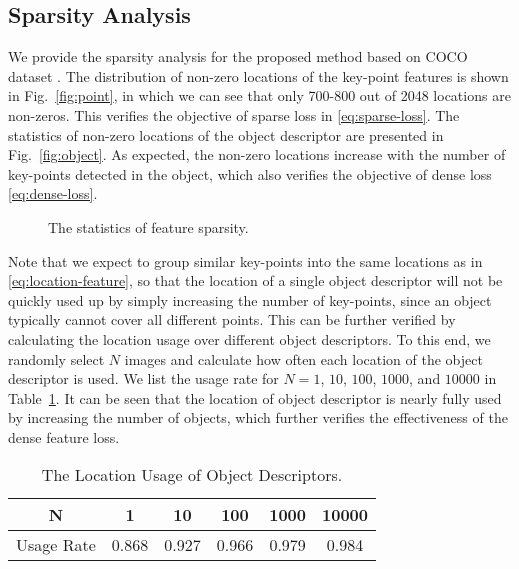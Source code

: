\documentclass[letterpaper, 10 pt, journal, twoside]{IEEEtran}  %
\newcommand{\fref}[1]{Fig.~\ref{#1}}
\newcommand{\tref}[1]{Table~\ref{#1}}
\newcommand{\fix}[1]{#1}
\begin{document}
\subsection{Sparsity Analysis}

We provide the sparsity analysis for the proposed method based on COCO dataset \cite{lin2014microsoft}.
The distribution of non-zero locations of the key-point features is shown in \fref{fig:point}, in which we can see that only 700-800 out of 2048 locations are non-zeros.
This verifies the objective of sparse loss in \eqref{eq:sparse-loss}.
The statistics of non-zero locations of the object descriptor are presented in \fref{fig:object}.
As expected, the non-zero locations increase with the number of key-points detected in the object, which also verifies the objective of dense loss \eqref{eq:dense-loss}.

\begin{figure}[t]
    \centering
    \hfill
    \caption{The statistics of feature sparsity.}
    \label{fig:sparsity}
\end{figure}

\fix{
Note that we expect to group similar key-points into the same locations as in \eqref{eq:location-feature}, so that the location of a single object descriptor will not be quickly used up by simply increasing the number of key-points, since an object typically cannot cover all different points.
This can be further verified by calculating the location usage over different object descriptors.
To this end, we randomly select $N$ images and calculate how often each location of the object descriptor is used. 
We list the usage rate for $N=1$, $10$, $100$, $1000$, and $10000$ in \tref{tab:occupied_rate}.
It can be seen that the location of object descriptor is nearly fully used by increasing the number of objects, which further verifies the effectiveness of the dense feature loss.
}


\begin{table}[h]
 \caption{\fix{The Location Usage of Object Descriptors.}}
 \label{tab:occupied_rate}
 \centering
 \begin{tabular}{cccccc}
     \toprule
     N & 1 & 10  &  100 &  1000 & 10000 \\
     \midrule
     Usage Rate & 0.868 & 0.927 & 0.966 & 0.979 & 0.984 \\
     \bottomrule
 \end{tabular}
\end{table}
\end{document}
